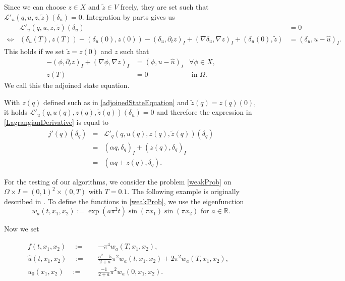 Since we can choose $z\in X$ and $\tilde{z}\in V$ freely, they are set such that $\mathcal{L}'_u(q,u,z,\tilde{z})(\delta_u)=0$. Integration by parts gives us
\begin{eqnarray*}
&\mathcal{L}'_u(q,u,z,\tilde{z})(\delta_u)&=0\\
\iff&(\delta_u(T),z(T))-(\delta_u(0),z(0))-(\delta_u,\partial_tz)_I+(\nabla\delta_u,\nabla z)_I+(\delta_u(0),\tilde{z})&=(\delta_u,u-\hat{u})_I.
\end{eqnarray*}
This holds if we set $\tilde{z}=z(0)$ and $z$ such that
\begin{equation}
\label{adjoinedStateEquation}
\begin{aligned}
	-(\phi,\partial_tz)_I+(\nabla \phi,\nabla z)_I&=(\phi, u-\hat{u})_I&\forall\phi\in X,\\
	z(T)&=0&\text{ in }\Omega.
\end{aligned}
\end{equation}
We call this the adjoined state equation.

With $z(q)$ defined such as in \eqref{adjoinedStateEquation} and $\tilde{z}(q)=z(q)(0)$, it holds $\mathcal{L}'_u(q,u(q),z(q),\tilde{z}(q))(\delta_u)=0$ and therefore the expression in \eqref{LagrangianDerivative} is equal to
\begin{eqnarray*}
j'(q)(\delta_q)&=&\mathcal{L}'_q(q, u(q), z(q), \tilde{z}(q))(\delta_q)\\
&=&(\alpha q,\delta_q)_I+(z(q),\delta_q)_I\\
&=&(\alpha q+z(q),\delta_q).
\end{eqnarray*}


For the testing of our algorithms, we consider the problem \eqref{weakProb} on $\Omega\times I=(0,1)^2\times(0,T)$ with $T=0.1$. The following example is originally described in \cite{doi:10.1137/070694016}. To define the functions in \eqref{weakProb}, we use the eigenfunction
\begin{displaymath}
w_a(t,x_1,x_2):=\exp(a\pi^2t)\sin(\pi x_1)\sin(\pi x_2) \text{ for } a\in\mathbb{R}.
\end{displaymath}

Now we set

\begin{equation*}
\begin{aligned}
f(t,x_1,x_2)\quad:=\quad&-\pi^4w_a(T,x_1,x_2),&\\
\hat{u}(t,x_1,x_2)\quad:=\quad&\frac{a^2-5}{2+a}\pi^2w_a(t,x_1,x_2)+2\pi^2w_a(T,x_1,x_2),&\\
u_0(x_1,x_2)\quad:=\quad&\frac{-1}{2+a}\pi^2w_a(0,x_1,x_2).&
\end{aligned}
\end{equation*}

